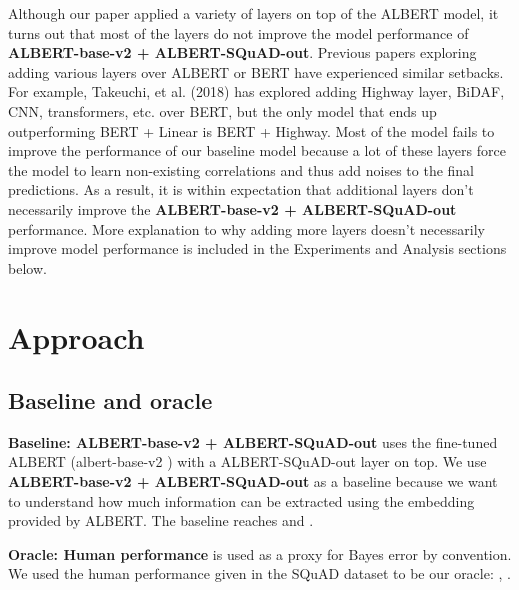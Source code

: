 \documentclass{article}
\begin{document}
Although our paper applied a variety of layers on top of the ALBERT model, it turns out that most of the layers do not improve the model performance of \textbf{ALBERT-base-v2 + ALBERT-SQuAD-out}. Previous papers exploring adding various layers over ALBERT or BERT have experienced similar setbacks. \citep{zhang_and_xu} \citep{haoshen_recommended_report} For example, Takeuchi, et al. (2018) has explored adding Highway layer, BiDAF, CNN, transformers, etc. over BERT, but the only model that ends up outperforming BERT + Linear is BERT + Highway. Most of the model fails to improve the performance of our baseline model because a lot of these layers force the model to learn non-existing correlations and thus add noises to the final predictions. As a result, it is within expectation that additional layers don't necessarily improve the \textbf{ALBERT-base-v2 + ALBERT-SQuAD-out} performance. More explanation to why adding more layers doesn't necessarily improve model performance is included in the Experiments and Analysis sections below.

\section{Approach}

\subsection{Baseline and oracle}

\textbf{Baseline: ALBERT-base-v2 + ALBERT-SQuAD-out} uses the fine-tuned ALBERT (albert-base-v2 \citep{albert}) with a ALBERT-SQuAD-out layer on top. We use \textbf{ALBERT-base-v2 + ALBERT-SQuAD-out} as a baseline because we want to understand how much information can be extracted using the embedding provided by ALBERT. The baseline reaches  and .

\textbf{Oracle: Human performance} is used as a proxy for Bayes error by convention. We used the human performance given in the SQuAD dataset to be our oracle: , . \citep{SQuAD}
\end{document}
